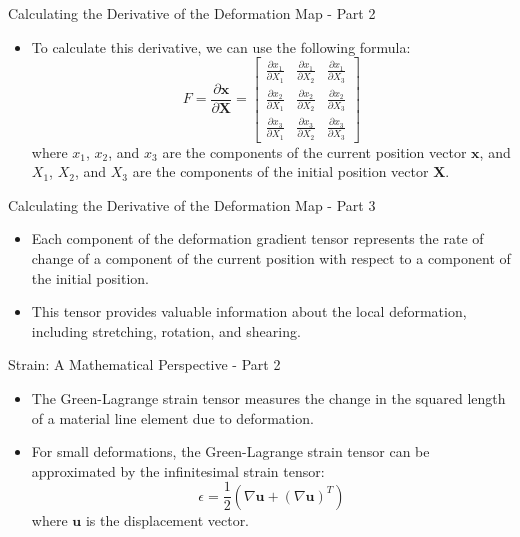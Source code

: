 \documentclass{beamer}
\begin{document}
\begin{frame}{Calculating the Derivative of the Deformation Map - Part 2}
    \begin{itemize}
        \item To calculate this derivative, we can use the following formula:
        \begin{equation*}
        F = \frac{\partial \mathbf{x}}{\partial \mathbf{X}} = \begin{bmatrix} \frac{\partial x_1}{\partial X_1} & \frac{\partial x_1}{\partial X_2} & \frac{\partial x_1}{\partial X_3} \\ \frac{\partial x_2}{\partial X_1} & \frac{\partial x_2}{\partial X_2} & \frac{\partial x_2}{\partial X_3} \\ \frac{\partial x_3}{\partial X_1} & \frac{\partial x_3}{\partial X_2} & \frac{\partial x_3}{\partial X_3} \end{bmatrix}
        \end{equation*}
        where $x_1$, $x_2$, and $x_3$ are the components of the current position vector $\mathbf{x}$, and $X_1$, $X_2$, and $X_3$ are the components of the initial position vector $\mathbf{X}$.
    \end{itemize}
\end{frame}

\begin{frame}{Calculating the Derivative of the Deformation Map - Part 3}
    \begin{itemize}
        \item Each component of the deformation gradient tensor represents the rate of change of a component of the current position with respect to a component of the initial position.
        \item This tensor provides valuable information about the local deformation, including stretching, rotation, and shearing.
    \end{itemize}
\end{frame}

\begin{frame}{Strain: A Mathematical Perspective - Part 2}
    \begin{itemize}
        \item The Green-Lagrange strain tensor measures the change in the squared length of a material line element due to deformation.
        \item For small deformations, the Green-Lagrange strain tensor can be approximated by the infinitesimal strain tensor:
        \begin{equation*}
        \epsilon = \frac{1}{2} (\nabla \mathbf{u} + (\nabla \mathbf{u})^T)
        \end{equation*}
        where $\mathbf{u}$ is the displacement vector.
    \end{itemize}
\end{frame}
\end{document}
